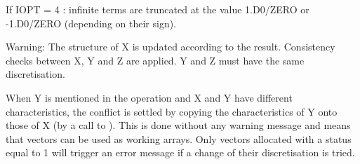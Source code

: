 If IOPT = 4 : infinite terms are truncated at the value 1.D0/ZERO or -1.D0/ZERO
(depending on their sign).

\begin{WarningBlock}{Warning:}
The structure of X is updated according to the result. Consistency checks
between X, Y and Z are applied. Y and Z must have the same discretisation.
\end{WarningBlock}


When Y is mentioned in the operation and X and Y have different
characteristics, the conflict is settled by copying the characteristics of Y
onto those of X (by a call to ). This is done without
any warning message and means that vectors can be used as working arrays. Only
vectors allocated with a status equal to 1 will trigger an error message if a
change of their discretisation is tried.

